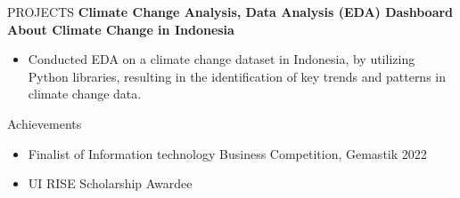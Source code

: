 \documentclass{resume} %
\begin{document}
\begin{rSection}{PROJECTS}
{\bf Climate Change Analysis, Data Analysis (EDA) Dashboard About Climate Change in Indonesia}
\vspace{-0.75em}
\begin{itemize}
\itemsep -7pt {}
\item Conducted EDA on a climate change dataset in Indonesia, by utilizing Python libraries, resulting in the identification of key trends and patterns in climate change data.
 \end{itemize}
 \vspace{-0.5em}


\end{rSection} 

\begin{rSection}{Achievements}

\begin{itemize}
\itemsep -7pt {}
\item Finalist of Information technology Business Competition, Gemastik 2022
\item UI RISE Scholarship Awardee
 \end{itemize}
 \vspace{-0.5em}


\end{rSection}
\end{document}
